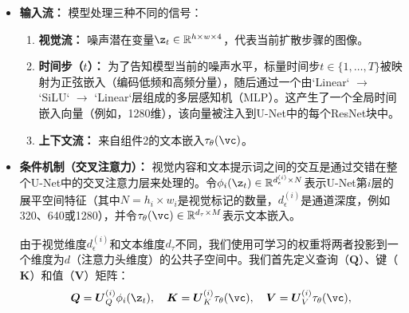 \documentclass[../../book-main_zh.tex]{subfiles}
\begin{document}
\begin{itemize}
    \item \textbf{输入流：} 模型处理三种不同的信号：
    \begin{enumerate}
        \item \textbf{视觉流：} 噪声潜在变量$\z_t \in \mathbb{R}^{h \times w \times 4}$，代表当前扩散步骤的图像。
        \item \textbf{时间步（$t$）：} 为了告知模型当前的噪声水平，标量时间步$t \in \{1, \dots, T\}$被映射为正弦嵌入（编码低频和高频分量），随后通过一个由`Linear` $\to$ `SiLU` $\to$ `Linear`层组成的多层感知机（MLP）。这产生了一个全局时间嵌入向量（例如，1280维），该向量被注入到U-Net中的每个ResNet块中。
        \item \textbf{上下文流：} 来自组件2的文本嵌入$\tau_\theta(\vc)$。
    \end{enumerate}

    \item \textbf{条件机制（交叉注意力）：} 视觉内容和文本提示词之间的交互是通过交错在整个U-Net中的交叉注意力层来处理的。令$\phi_i(\z_t) \in \mathbb{R}^{d_\epsilon^{(i)} \times N}$表示U-Net第$i$层的展平空间特征（其中$N = h_i \times w_i$是视觉标记的数量，$d_\epsilon^{(i)}$是通道深度，例如320、640或1280），并令$\tau_\theta(\vc) \in \mathbb{R}^{d_\tau \times M}$表示文本嵌入。
    
    由于视觉维度$d_\epsilon^{(i)}$和文本维度$d_\tau$不同，我们使用可学习的权重将两者投影到一个维度为$d$（注意力头维度）的公共子空间中。我们首先定义查询（$\boldsymbol{Q}$）、键（$\boldsymbol{K}$）和值（$\boldsymbol{V}$）矩阵：
    \begin{equation}
        \boldsymbol{Q} = \boldsymbol{U}^{(i)}_{Q} \phi_i(\z_t), \quad
        \boldsymbol{K} = \boldsymbol{U}^{(i)}_{K} \tau_\theta(\vc), \quad
        \boldsymbol{V} = \boldsymbol{U}^{(i)}_{V} \tau_\theta(\vc),
    \end{equation}
    

\end{itemize}
\end{document}
